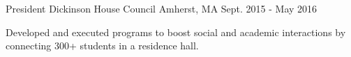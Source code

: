 

\begin{cventries}

  \cventry
    {President} %
    {Dickinson House Council} %
    {Amherst, MA} %
    {Sept. 2015 - May 2016} %
    {
      \begin{cvitems} %
        \item {Developed and executed programs to boost social and academic interactions by connecting 300+ students in a residence hall.}
      \end{cvitems}
    }
\end{cventries}